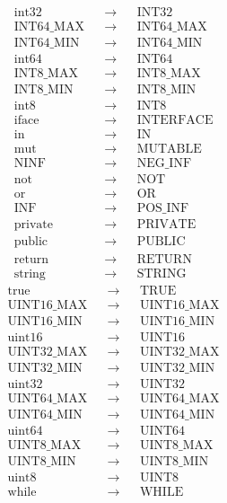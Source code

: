 \documentclass[]{article}
\begin{document}
\begin{align}
    &\text{int32}        &&\to &&\text{INT32}           \\
    &\text{INT64\_MAX}   &&\to &&\text{INT64\_MAX}      \\
    &\text{INT64\_MIN}   &&\to &&\text{INT64\_MIN}      \\
    &\text{int64}        &&\to &&\text{INT64}           \\
    &\text{INT8\_MAX}    &&\to &&\text{INT8\_MAX}       \\
    &\text{INT8\_MIN}    &&\to &&\text{INT8\_MIN}       \\
    &\text{int8}         &&\to &&\text{INT8}            \\
    &\text{iface}        &&\to &&\text{INTERFACE}       \\
    &\text{in}           &&\to &&\text{IN}              \\
    &\text{mut}          &&\to &&\text{MUTABLE}         \\
    &\text{NINF}         &&\to &&\text{NEG\_INF}        \\
    &\text{not}          &&\to &&\text{NOT}             \\
    &\text{or}           &&\to &&\text{OR}              \\
    &\text{INF}          &&\to &&\text{POS\_INF}        \\
    &\text{private}      &&\to &&\text{PRIVATE}         \\
    &\text{public}       &&\to &&\text{PUBLIC}          \\
    &\text{return}       &&\to &&\text{RETURN}          \\
    &\text{string}       &&\to &&\text{STRING}
\end{align}
\begin{align}
    &\text{true}         &&\to &&\text{TRUE}            \\
    &\text{UINT16\_MAX}  &&\to &&\text{UINT16\_MAX}     \\
    &\text{UINT16\_MIN}  &&\to &&\text{UINT16\_MIN}     \\
    &\text{uint16}       &&\to &&\text{UINT16}          \\
    &\text{UINT32\_MAX}  &&\to &&\text{UINT32\_MAX}     \\
    &\text{UINT32\_MIN}  &&\to &&\text{UINT32\_MIN}     \\
    &\text{uint32}       &&\to &&\text{UINT32}          \\
    &\text{UINT64\_MAX}  &&\to &&\text{UINT64\_MAX}     \\
    &\text{UINT64\_MIN}  &&\to &&\text{UINT64\_MIN}     \\
    &\text{uint64}       &&\to &&\text{UINT64}          \\
    &\text{UINT8\_MAX}   &&\to &&\text{UINT8\_MAX}      \\
    &\text{UINT8\_MIN}   &&\to &&\text{UINT8\_MIN}      \\
    &\text{uint8}        &&\to &&\text{UINT8}           \\
    &\text{while}        &&\to &&\text{WHILE}
\end{align}
\end{document}
